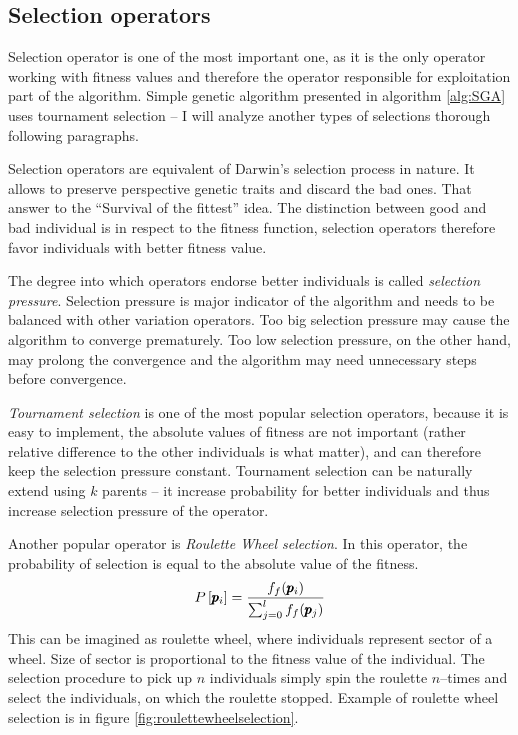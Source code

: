 \subsection{Selection operators}

Selection operator is one of the most important one, as it is the only operator working with fitness values and therefore the operator responsible for exploitation part of the algorithm. Simple genetic algorithm presented in algorithm \ref{alg:SGA} uses tournament selection -- I will analyze another types of selections thorough following paragraphs.

Selection operators are equivalent of Darwin's selection process in nature. It allows to preserve perspective genetic traits and discard the bad ones. That answer to the \enquote{Survival of the fittest} idea. The distinction between good and bad individual is in respect to the fitness function, selection operators therefore favor individuals with better fitness value.

The degree into which operators endorse better individuals is called \emph{selection pressure}. Selection pressure is major indicator of the algorithm and needs to be balanced with other variation operators. Too big selection pressure may cause the algorithm to converge prematurely. Too low selection pressure, on the other hand, may prolong the convergence and the algorithm may need unnecessary steps before convergence.

\emph{Tournament selection} is one of the most popular selection operators, because it is easy to implement, the absolute values of fitness are not important (rather relative difference to the other individuals is what matter), and can therefore keep the selection pressure constant. Tournament selection can be naturally extend using $k$ parents -- it increase probability for better individuals and thus increase selection pressure of the operator.

Another popular operator is \emph{Roulette Wheel selection}. In this operator, the probability of selection is equal to the absolute value of the fitness.
$$ P\left[\pmb{p}_i\right] = \frac{f_f(\pmb{p}_i)}{\sum_{j=0}^{l}f_f(\pmb{p}_j)} $$
This can be imagined as roulette wheel, where individuals represent sector of a wheel. Size of sector is proportional to the fitness value of the individual. The selection procedure to pick up $n$ individuals simply spin the roulette $n$--times and select the individuals, on which the roulette stopped. Example of roulette wheel selection is in figure \ref{fig:roulettewheelselection}.

